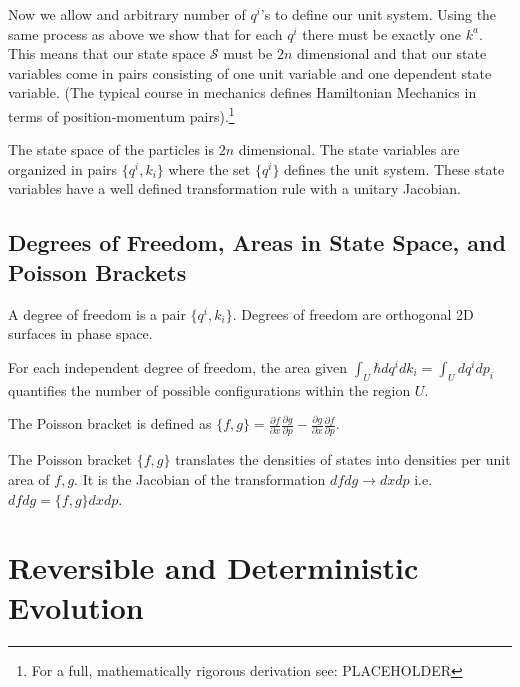 \documentclass{article}
\begin{document}
	
	Now we allow and arbitrary number of $q^i$'s to define our unit system. Using the same process as above we show that for each $q^i$ there must be exactly one $k^a$. This means that our state space $\mathcal{S}$ must be $2n$ dimensional and that our state variables come in pairs consisting of one unit variable and one dependent state variable. (The typical course in mechanics defines Hamiltonian Mechanics in terms of position-momentum pairs).\footnote{For a full, mathematically rigorous derivation see: PLACEHOLDER}

\begin{prop}
	The state space of the particles is $2n$ dimensional. The state variables are organized in pairs $\{q^i, k_i\}$ where the set $\{q^i\}$ defines the unit system. These state variables have a well defined transformation rule with a unitary Jacobian.
\end{prop}

\subsection{Degrees of Freedom, Areas in State Space, and Poisson Brackets}

\begin{defn}
	A degree of freedom is a pair $\{q^i,k_i\}$. Degrees of freedom are orthogonal 2D surfaces in phase space.
\end{defn}
	
\begin{prop}
	For each independent degree of freedom, the area given $\int_U \hbar dq^i dk_i = \int_U dq^i dp_i$ quantifies the number of possible configurations within the region $U$.
\end{prop}

\begin{defn}
	The Poisson bracket is defined as $\{f,g\} = \frac{\partial f}{\partial x}\frac{\partial g}{\partial p} - \frac{\partial g}{\partial x}\frac{\partial f}{\partial p}$.
\end{defn}

\begin{prop}
	The Poisson bracket $\{f, g\}$ translates the densities of states into densities per unit area of $f, g$. It is the Jacobian of the transformation $dfdg \rightarrow dxdp$ i.e. $dfdg = \{f,g\}dxdp$.
\end{prop}
	
\section{Reversible and Deterministic Evolution}
\end{document}
